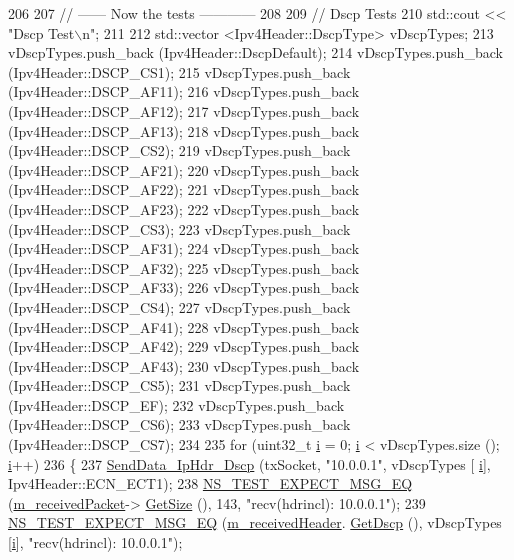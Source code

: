 \begin{DoxyCode}
206 
207   \textcolor{comment}{// ------ Now the tests ------------}
208 
209   \textcolor{comment}{// Dscp Tests}
210   std::cout << \textcolor{stringliteral}{"Dscp Test\(\backslash\)n"};
211 
212   std::vector <Ipv4Header::DscpType> vDscpTypes;
213   vDscpTypes.push\_back (Ipv4Header::DscpDefault);
214   vDscpTypes.push\_back (Ipv4Header::DSCP\_CS1);
215   vDscpTypes.push\_back (Ipv4Header::DSCP\_AF11);
216   vDscpTypes.push\_back (Ipv4Header::DSCP\_AF12);
217   vDscpTypes.push\_back (Ipv4Header::DSCP\_AF13);
218   vDscpTypes.push\_back (Ipv4Header::DSCP\_CS2);
219   vDscpTypes.push\_back (Ipv4Header::DSCP\_AF21);
220   vDscpTypes.push\_back (Ipv4Header::DSCP\_AF22);
221   vDscpTypes.push\_back (Ipv4Header::DSCP\_AF23);
222   vDscpTypes.push\_back (Ipv4Header::DSCP\_CS3);
223   vDscpTypes.push\_back (Ipv4Header::DSCP\_AF31);
224   vDscpTypes.push\_back (Ipv4Header::DSCP\_AF32);
225   vDscpTypes.push\_back (Ipv4Header::DSCP\_AF33);
226   vDscpTypes.push\_back (Ipv4Header::DSCP\_CS4);
227   vDscpTypes.push\_back (Ipv4Header::DSCP\_AF41);
228   vDscpTypes.push\_back (Ipv4Header::DSCP\_AF42);
229   vDscpTypes.push\_back (Ipv4Header::DSCP\_AF43);
230   vDscpTypes.push\_back (Ipv4Header::DSCP\_CS5);
231   vDscpTypes.push\_back (Ipv4Header::DSCP\_EF);
232   vDscpTypes.push\_back (Ipv4Header::DSCP\_CS6);
233   vDscpTypes.push\_back (Ipv4Header::DSCP\_CS7);
234 
235   \textcolor{keywordflow}{for} (uint32\_t \hyperlink{bernuolliDistribution_8m_a6f6ccfcf58b31cb6412107d9d5281426}{i} = 0; \hyperlink{bernuolliDistribution_8m_a6f6ccfcf58b31cb6412107d9d5281426}{i} < vDscpTypes.size (); \hyperlink{bernuolliDistribution_8m_a6f6ccfcf58b31cb6412107d9d5281426}{i}++)
236     \{
237       \hyperlink{classIpv4HeaderTest_afbd0cfc4212b3a0d8846faa662cbc7bc}{SendData\_IpHdr\_Dscp} (txSocket, \textcolor{stringliteral}{"10.0.0.1"}, vDscpTypes [
      \hyperlink{bernuolliDistribution_8m_a6f6ccfcf58b31cb6412107d9d5281426}{i}], Ipv4Header::ECN\_ECT1);
238       \hyperlink{group__testing_ga7304ba46a28d8cf08dfdfd6499cf7068}{NS\_TEST\_EXPECT\_MSG\_EQ} (\hyperlink{classIpv4HeaderTest_a4806396ea5249b214fce8a349f40b07b}{m\_receivedPacket}->
      \hyperlink{classns3_1_1Packet_a462855c9929954d4301a4edfe55f4f1c}{GetSize} (), 143, \textcolor{stringliteral}{"recv(hdrincl): 10.0.0.1"});
239       \hyperlink{group__testing_ga7304ba46a28d8cf08dfdfd6499cf7068}{NS\_TEST\_EXPECT\_MSG\_EQ} (\hyperlink{classIpv4HeaderTest_a667ff4bfd280469a2814685903b1159f}{m\_receivedHeader}.
      \hyperlink{classns3_1_1Ipv4Header_a60d238b9d5f491df4d7626382505b0fe}{GetDscp} (), vDscpTypes [\hyperlink{bernuolliDistribution_8m_a6f6ccfcf58b31cb6412107d9d5281426}{i}], \textcolor{stringliteral}{"recv(hdrincl): 10.0.0.1"});

\end{DoxyCode}

